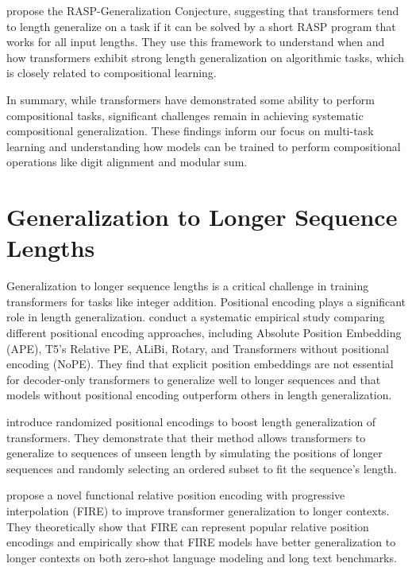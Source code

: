 \cite{zhou_what_2023} propose the RASP-Generalization Conjecture, suggesting that transformers tend to length generalize on a task if it can be solved by a short RASP program that works for all input lengths. They use this framework to understand when and how transformers exhibit strong length generalization on algorithmic tasks, which is closely related to compositional learning.

In summary, while transformers have demonstrated some ability to perform compositional tasks, significant challenges remain in achieving systematic compositional generalization. These findings inform our focus on multi-task learning and understanding how models can be trained to perform compositional operations like digit alignment and modular sum.

\section{Generalization to Longer Sequence Lengths}\label{sota_generalization_to_longer_sequences}

Generalization to longer sequence lengths is a critical challenge in training transformers for tasks like integer addition. Positional encoding plays a significant role in length generalization. \cite{kazemnejad_impact_2023} conduct a systematic empirical study comparing different positional encoding approaches, including Absolute Position Embedding (APE), T5's Relative PE, ALiBi, Rotary, and Transformers without positional encoding (NoPE). They find that explicit position embeddings are not essential for decoder-only transformers to generalize well to longer sequences and that models without positional encoding outperform others in length generalization.

\cite{ruoss_randomized_2023} introduce randomized positional encodings to boost length generalization of transformers. They demonstrate that their method allows transformers to generalize to sequences of unseen length by simulating the positions of longer sequences and randomly selecting an ordered subset to fit the sequence's length.

\cite{li_functional_2024} propose a novel functional relative position encoding with progressive interpolation (FIRE) to improve transformer generalization to longer contexts. They theoretically show that FIRE can represent popular relative position encodings and empirically show that FIRE models have better generalization to longer contexts on both zero-shot language modeling and long text benchmarks.


